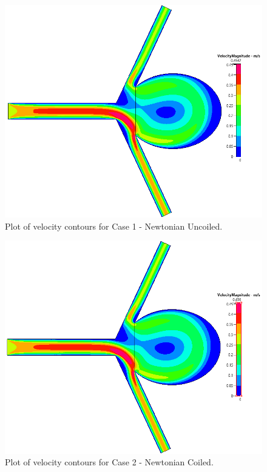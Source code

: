 \documentclass[journal,twoside,web]{ieeecolor}
\begin{document}
\begin{figure}[!t]
    \centerline{\includegraphics[width=\columnwidth]{img/geom15Velocity.png}}
    \caption{Plot of velocity contours for Case 1 - Newtonian Uncoiled.}
    \label{geom15V}
\end{figure}
\begin{figure}[!t]
    \centerline{\includegraphics[width=\columnwidth]{img/geom17Velocity.png}}
    \caption{Plot of velocity contours for Case 2 - Newtonian Coiled.}
    \label{geom17V}
\end{figure}
\end{document}
